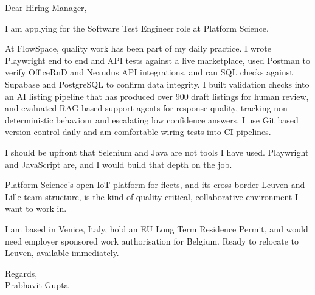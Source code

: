 \documentclass[a4paper,11pt]{article}
\begin{document}
Dear Hiring Manager,

I am applying for the Software Test Engineer role at Platform Science.

At FlowSpace, quality work has been part of my daily practice. I wrote Playwright end to end and API tests against a live marketplace, used Postman to verify OfficeRnD and Nexudus API integrations, and ran SQL checks against Supabase and PostgreSQL to confirm data integrity. I built validation checks into an AI listing pipeline that has produced over 900 draft listings for human review, and evaluated RAG based support agents for response quality, tracking non deterministic behaviour and escalating low confidence answers. I use Git based version control daily and am comfortable wiring tests into CI pipelines.

I should be upfront that Selenium and Java are not tools I have used. Playwright and JavaScript are, and I would build that depth on the job.

Platform Science's open IoT platform for fleets, and its cross border Leuven and Lille team structure, is the kind of quality critical, collaborative environment I want to work in.

I am based in Venice, Italy, hold an EU Long Term Residence Permit, and would need employer sponsored work authorisation for Belgium. Ready to relocate to Leuven, available immediately.

Regards,\\
Prabhavit Gupta
\end{document}
